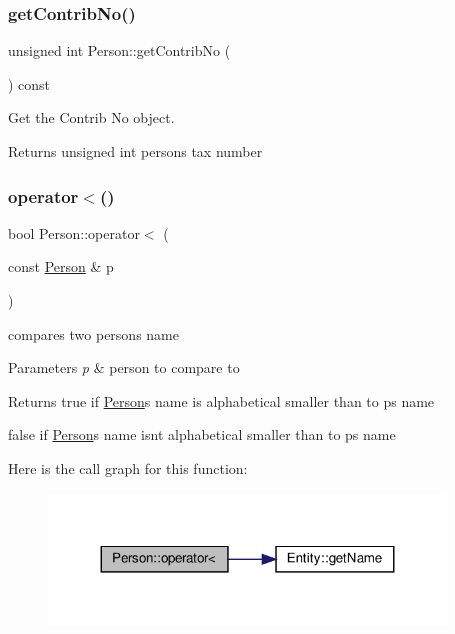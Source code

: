 \subsubsection{\texorpdfstring{get\+Contrib\+No()}{getContribNo()}}
{\footnotesize\ttfamily unsigned int Person\+::get\+Contrib\+No (\begin{DoxyParamCaption}{ }\end{DoxyParamCaption}) const}



Get the Contrib No object. 

\begin{DoxyReturn}{Returns}
unsigned int person\textquotesingle{}s tax number 
\end{DoxyReturn}
\mbox{\label{classPerson_aa61a8197d96d683b6c779a32382349cc}} 
\subsubsection{\texorpdfstring{operator$<$()}{operator<()}}
{\footnotesize\ttfamily bool Person\+::operator$<$ (\begin{DoxyParamCaption}\item[{const \hyperlink{classPerson}{Person} \&}]{p }\end{DoxyParamCaption})}



compares two person\textquotesingle{}s name 


\begin{DoxyParams}{Parameters}
{\em p} & person to compare to\\
\hline
\end{DoxyParams}
\begin{DoxyReturn}{Returns}
true if \hyperlink{classPerson}{Person}\textquotesingle{}s name is alphabetical smaller than to p\textquotesingle{}s name 

false if \hyperlink{classPerson}{Person}\textquotesingle{}s name isn\textquotesingle{}t alphabetical smaller than to p\textquotesingle{}s name 
\end{DoxyReturn}
Here is the call graph for this function\+:\nopagebreak
\begin{figure}[H]
\begin{center}
\leavevmode
\includegraphics[width=299pt]{classPerson_aa61a8197d96d683b6c779a32382349cc_cgraph}
\end{center}
\end{figure}
\mbox{\label{classPerson_a8b98ec6713875725a005f2b0ad19fa4c}} 
